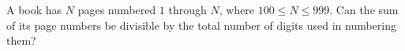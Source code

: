 A book has $N$ pages numbered $1$ through $N$, where $100\le N\le999$. Can the sum of its page numbers be divisible by the total number of digits used in numbering them?
